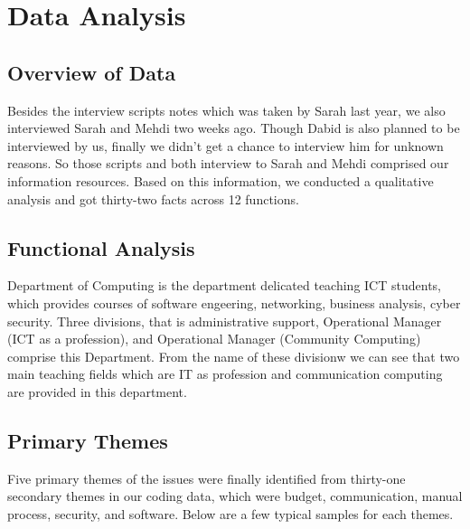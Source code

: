 
\section{Data Analysis}

\subsection{Overview of Data}

Besides the interview scripts notes which was taken by Sarah last year, we also interviewed Sarah and Mehdi two weeks ago. Though Dabid is also planned to be interviewed by us, finally we didn't get a chance to interview him for unknown reasons. So those scripts and both interview to Sarah and Mehdi comprised our information resources. Based on this information, we conducted a qualitative analysis and got thirty-two facts across 12 functions.

\subsection{Functional Analysis}

Department of Computing is the department delicated teaching ICT students, which provides courses of software engeering, networking, business analysis, cyber security. Three divisions, that is administrative support, Operational Manager (ICT as a profession), and Operational Manager (Community Computing) comprise this Department. From the name of these divisionw we can see that two main teaching fields which are IT as profession and communication computing are provided in this department.

\subsection{Primary Themes}
Five primary themes of the issues were finally identified from thirty-one secondary themes in our coding data, which were budget, communication, manual process, security, and software. Below are a few typical samples for each themes.

